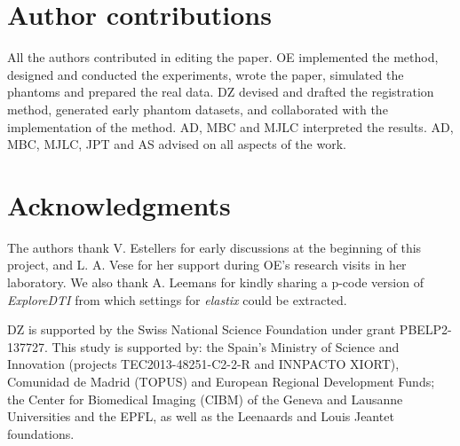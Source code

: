 \section*{Author contributions}
All the authors contributed in editing the paper.
OE implemented the method, designed and conducted the experiments, wrote the paper,
  simulated the phantoms and prepared the real data.
DZ devised and drafted the registration method, generated early phantom datasets, and
  collaborated with the implementation of the method.
AD, MBC and MJLC interpreted the results.
AD, MBC, MJLC, JPT and AS advised on all aspects of the work.

\section*{Acknowledgments}
The authors thank V. Estellers for early discussions at the beginning of this project,
  and L. A. Vese for her support during OE's research visits in her laboratory.
We also thank A. Leemans for kindly sharing a p-code version of \emph{ExploreDTI} from
  which settings for \emph{elastix} could be extracted.

DZ is supported by the Swiss National Science Foundation under grant PBELP2-137727.
This study is supported by: the Spain's Ministry of Science and Innovation
  (projects TEC2013-48251-C2-2-R and INNPACTO XIORT), Comunidad de Madrid (TOPUS) and
  European Regional Development Funds; the Center for Biomedical Imaging
  (CIBM) of the Geneva and Lausanne Universities and the EPFL, as well as the
  Leenaards and Louis Jeantet foundations.
